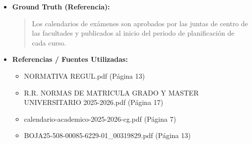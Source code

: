 \documentclass[12pt,a4paper,oneside]{report}
\begin{document}
\begin{itemize}
\begin{itemize}
\begin{quote}
Aunque no se proporciona una fecha específica para la publicación del calendario de exámenes, se puede inferir que se publica antes del inicio del curso académico.

En el contexto proporcionado, se menciona que el Calendario Académico para el curso \textbf{2025-2026} fue aprobado por el Consejo de Gobierno el \textbf{20 de marzo de 2025}.

Por lo tanto, se puede concluir que el calendario de exámenes para el curso \textbf{2025-2026} fue publicado en marzo de \textbf{2025}. 

No obstante, para futuras referencias, se recomienda verificar la página web oficial de la Universidad de Sevilla o contactar con la institución para obtener la información más actualizada sobre la publicación del calendario de exámenes.
                \end{quote}
          \item \textbf{{Ground Truth (Referencia):}} \\
                \begin{quote}
Los calendarios de exámenes son aprobados por las juntas de centro de las facultades y publicados al inicio del periodo de planificación de cada curso.
                \end{quote}
          \item \textbf{{Referencias / Fuentes Utilizadas:}} \\
                \begin{itemize}
                  \item NORMATIVA REGUL.pdf (Página 13)
                  \item R.R. NORMAS DE MATRICULA GRADO Y MASTER UNIVERSITARIO 2025-2026.pdf (Página 17)
                  \item calendario-academico-2025-2026-cg.pdf (Página 7)
                  \item BOJA25-508-00085-6229-01\_00319829.pdf (Página 13)
                \end{itemize}
        \end{itemize}


\end{itemize}
\end{document}
